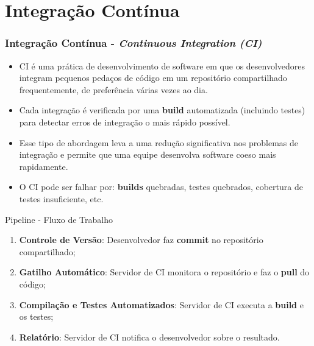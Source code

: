 \documentclass[
	9pt, %
	t, %
]{beamer}
\newcommand{\yellowbox}[1]{\colorbox{yellow!75}{#1}}
\begin{document}
\section{Integração Contínua} %


\begin{frame}
	\frametitle{Integração Contínua - \textit{Continuous Integration (CI)}}
	\begin{itemize}
		\item CI é uma \yellowbox{prática} de desenvolvimento de software em que os desenvolvedores integram \yellowbox{pequenos pedaços} de código em um repositório compartilhado \yellowbox{frequentemente}, de preferência várias vezes ao dia.
		\item Cada integração é verificada por uma \yellowbox{\textbf{build} automatizada} (incluindo testes) para detectar erros de integração o mais rápido possível.
		\item Esse tipo de abordagem leva a uma redução significativa nos problemas de integração e permite que uma equipe desenvolva software coeso mais rapidamente.
		\item O CI pode ser falhar por: \textbf{builds} quebradas, testes quebrados, cobertura de testes insuficiente, etc.
	\end{itemize}

	\begin{block}{Pipeline - Fluxo de Trabalho}
		\begin{enumerate}
			\item \textbf{Controle de Versão}: Desenvolvedor faz \textbf{commit} no repositório compartilhado;
			\item \textbf{Gatilho Automático}: Servidor de CI monitora o repositório e faz o \textbf{pull} do código;
			\item \textbf{Compilação e Testes Automatizados}: Servidor de CI executa a \textbf{build} e os testes;
			\item \textbf{Relatório}: Servidor de CI notifica o desenvolvedor sobre o resultado. 
		\end{enumerate}
	\end{block}

\end{frame}
\end{document}

